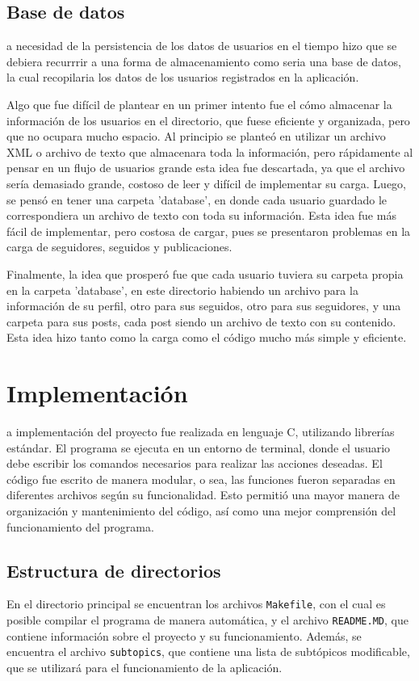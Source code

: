 \documentclass[9pt,letterpaper,onecolumn]{rho-class/rho}
\begin{document}
\subsection{Base de datos}

a necesidad de la persistencia de los datos de usuarios en el tiempo hizo que se debiera recurrrir a una forma de almacenamiento como seria una base de datos, la cual recopilaria los datos de los usuarios registrados en la aplicación.

Algo que fue difícil de plantear en un primer intento fue el cómo almacenar la información de los usuarios en el directorio, que fuese eficiente y organizada, pero que no ocupara mucho espacio. Al principio se planteó en utilizar un archivo XML o archivo de texto que almacenara toda la información, pero rápidamente al pensar en un flujo de usuarios grande esta idea fue descartada, ya que el archivo sería demasiado grande, costoso de leer y difícil de implementar su carga. Luego, se pensó en tener una carpeta 'database', en donde cada usuario guardado le correspondiera un archivo de texto con toda su información. Esta idea fue más fácil de implementar, pero costosa de cargar, pues se presentaron problemas en la carga de seguidores, seguidos y publicaciones.

\vspace{0.5cm}

Finalmente, la idea que prosperó fue que cada usuario tuviera su carpeta propia en la carpeta 'database', en este directorio habiendo un archivo para la información de su perfil, otro para sus seguidos, otro para sus seguidores, y una carpeta para sus posts, cada post siendo un archivo de texto con su contenido. Esta idea hizo tanto como la carga como el código mucho más simple y eficiente.
\newpage
\section{Implementación}

a implementación del proyecto fue realizada en lenguaje C, utilizando librerías estándar. El programa se ejecuta en un entorno de terminal, donde el usuario debe escribir los comandos necesarios para realizar las acciones deseadas. El código fue escrito de manera modular, o sea, las funciones fueron separadas en diferentes archivos según su funcionalidad. Esto permitió una mayor manera de organización y mantenimiento del código, así como una mejor comprensión del funcionamiento del programa.

\subsection{Estructura de directorios}
En el directorio principal se encuentran los archivos \texttt{Makefile}, con el cual es posible compilar el programa de manera automática, y el archivo \texttt{README.MD}, que contiene información sobre el proyecto y su funcionamiento. Además, se encuentra el archivo \texttt{subtopics}, que contiene una lista de subtópicos modificable, que se utilizará para el funcionamiento de la aplicación.
\end{document}
